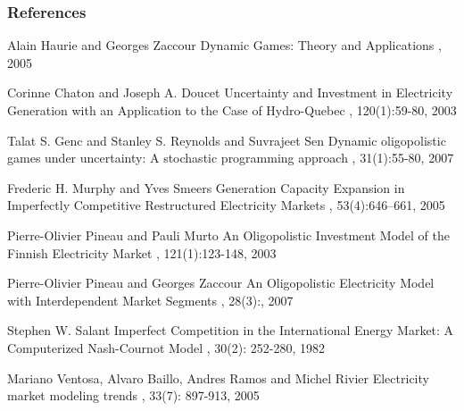 \documentclass[mathserif,10pt]{beamer}
\begin{document}
\begin{frame}[allowframebreaks]
      \frametitle<presentation>{References}

      \begin{thebibliography}{8}

\beamertemplatebookbibitems
{}
Alain Haurie and Georges Zaccour
\newblock Dynamic Games: Theory and Applications
, 2005


\beamertemplatearticlebibitems

Corinne Chaton and Joseph A. Doucet
\newblock Uncertainty and Investment in Electricity Generation with an Application to the Case of Hydro-Quebec 
, 120(1):59-80, 2003
    
Talat S. Genc and Stanley S. Reynolds and Suvrajeet Sen
\newblock Dynamic oligopolistic games under uncertainty: A stochastic programming approach
, 31(1):55-80, 2007 

Frederic H. Murphy and Yves Smeers
\newblock Generation Capacity Expansion in Imperfectly Competitive Restructured Electricity Markets
, 53(4):646--661, 2005
	
Pierre-Olivier Pineau and Pauli Murto
\newblock An Oligopolistic Investment Model of the Finnish Electricity Market
, 121(1):123-148, 2003

Pierre-Olivier Pineau and Georges Zaccour
\newblock An Oligopolistic Electricity Model with Interdependent Market Segments
, 28(3):, 2007

Stephen W. Salant
\newblock Imperfect Competition in the International Energy Market: A Computerized Nash-Cournot Model , 30(2): 252-280, 1982

Mariano Ventosa, Alvaro Baillo, Andres Ramos and Michel Rivier
\newblock Electricity market modeling trends
, 33(7): 897-913, 2005

   \end{thebibliography}
\end{frame}
\end{document}
